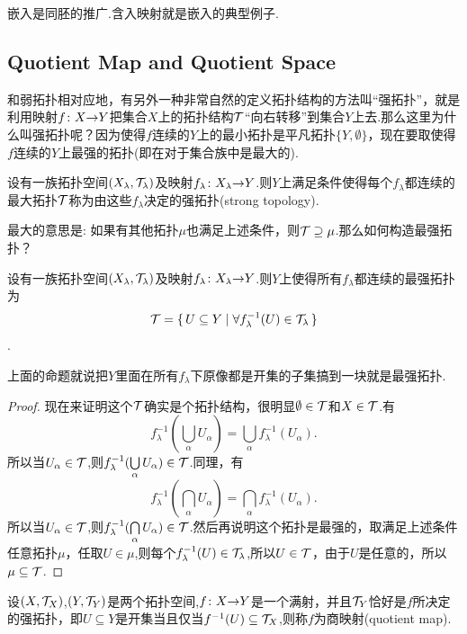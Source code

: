 嵌入是同胚的推广.含入映射就是嵌入的典型例子.


\newpage
\subsection{Quotient Map and Quotient Space}
和弱拓扑相对应地，有另外一种非常自然的定义拓扑结构的方法叫“强拓扑”，就是利用映射${f}\colon{X}{\to}{Y}$把集合$X$上的拓扑结构$\mathcal{T}$“向右转移”到集合$Y$上去.那么这里为什么叫强拓扑呢？因为使得$f$连续的$Y$上的最小拓扑是平凡拓扑$\{Y,\emptyset\}$，现在要取使得$f$连续的$Y$上最强的拓扑(即在对于集合族中是最大的).


\begin{definition}
设有一族拓扑空间$(X_\lambda,\mathcal{T}_\lambda)$及映射${f_\lambda}\colon{X_\lambda}{\to}{Y}$.则$Y$上满足条件使得每个$f_\lambda$都连续的最大拓扑$\mathcal{T}$称为由这些$f_\lambda$决定的强拓扑(strong topology).
\end{definition}

最大的意思是: 如果有其他拓扑$\mu$也满足上述条件，则$\mathcal{T} \supseteq \mu$.那么如何构造最强拓扑？

\begin{definition}
设有一族拓扑空间$(X_\lambda,\mathcal{T}_\lambda)$及映射${f_\lambda}\colon{X_\lambda}{\to}{Y}$.则$Y$上使得所有$f_\lambda$都连续的最强拓扑为\[\mathcal{T} = \{\,U \subseteq Y\mid\forall f_\lambda^{-1}(U) \in \mathcal{T}_\lambda\,\}\].
\end{definition}

上面的命题就说把$Y$里面在所有$f_\lambda$下原像都是开集的子集搞到一块就是最强拓扑.

\begin{proof}
现在来证明这个$\mathcal{T}$确实是个拓扑结构，很明显$\emptyset \in \mathcal{T}$和$X \in \mathcal{T}$.有\[f^{-1}_\lambda(\bigcup\limits_{\alpha} U_\alpha)=\bigcup\limits_\alpha f_\lambda^{-1}(U_\alpha).\]所以当$U_\alpha \in \mathcal{T}$,则$f^{-1}_\lambda(\bigcup\limits_{\alpha} U_\alpha) \in \mathcal{T}$.同理，有\[f^{-1}_\lambda(\bigcap\limits_{\alpha} U_\alpha)=\bigcap\limits_\alpha f_\lambda^{-1}(U_\alpha).\]所以当$U_\alpha \in \mathcal{T}$,则$f^{-1}_\lambda(\bigcap\limits_{\alpha} U_\alpha) \in \mathcal{T}$.然后再说明这个拓扑是最强的，取满足上述条件任意拓扑$\mu$，任取$U \in \mu$,则每个$f_\lambda^{-1}(U) \in \mathcal{T}_\lambda$,所以$U \in \mathcal{T}$，由于$U$是任意的，所以$\mu \subseteq \mathcal{T}$.
\end{proof}

\begin{definition}
设$(X,\mathcal{T}_X)$,$(Y,\mathcal{T}_Y)$是两个拓扑空间,${f}\colon{X}{\to}{Y}$是一个满射，并且$\mathcal{T}_Y$恰好是$f$所决定的强拓扑，即$U \subseteq Y$是开集当且仅当$f^{-1}(U) \subseteq \mathcal{T}_X$,则称$f$为商映射(quotient map).
\end{definition}

